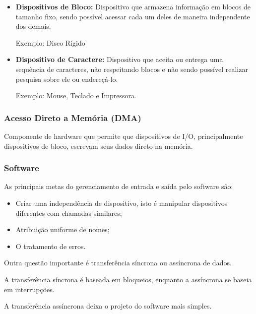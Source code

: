 \begin{itemize}
	\item \textbf{Dispositivos de Bloco:} Dispositivo que armazena informação em blocos de tamanho fixo, sendo possível acessar cada um deles de maneira independente dos demais.
	
	Exemplo: Disco Rígido
	
	\item \textbf{Dispositivo de Caractere:} Dispositivo que aceita ou entrega uma sequência de caracteres, não respeitando blocos e não sendo possível realizar pesquisa sobre ele ou endereçá-lo.
	
	Exemplo: Mouse, Teclado e Impressora. 		
\end{itemize}

\subsubsection{Acesso Direto a Memória (DMA)}

Componente de hardware que permite que dispositivos de I/O, principalmente dispositivos de bloco, escrevam seus dados direto na memória.

\subsubsection{Software}

As principais metas do gerenciamento de entrada e saída pelo software são: 

\begin{itemize}
	\item Criar uma independência de dispositivo, isto é  manipular dispositivos diferentes com chamadas similares;
	
	\item Atribuição uniforme de nomes;

	\item O tratamento de erros.
\end{itemize}

Outra questão importante é transferência síncrona ou assíncrona de dados.

A transferência síncrona é baseada em bloqueios, enquanto a assíncrona se baseia em interrupções.

A transferência assíncrona deixa o projeto do software mais simples.